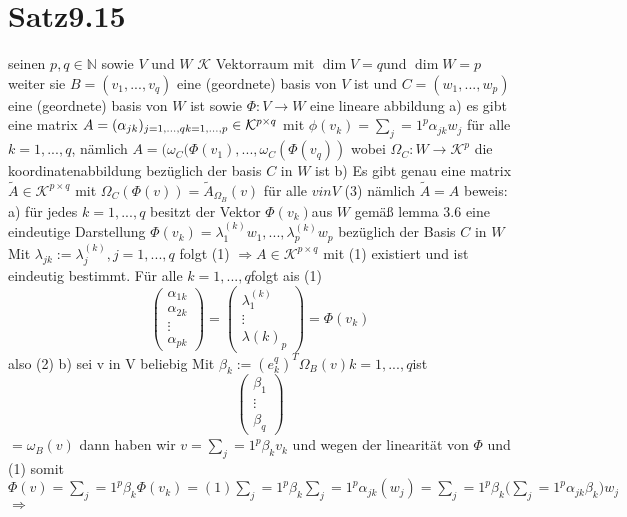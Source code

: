 \documentclass[11pt]{article}
\begin{document}
\section{Satz9.15}
seinen $  p,q \in \mathbb{N}$ sowie $V$ und $W$ $\mathcal{K}$ Vektorraum mit $\dim V =q $und $\dim W =p $ weiter sie $B= (v_1,...,v_q)$
eine  (geordnete) basis von $V$ ist und $C=(w_1,...,w_p)$ eine (geordnete) basis von $W$ ist 
sowie $\Phi: V\rightarrow W$ eine lineare abbildung
a)
es gibt eine matrix $A= (\alpha_{jk})_{j=1,...,q\\ k=1,...,p} \in \mathcal{K}^{p\times q}$ mit 
$\phi (v_k)= \sum_j=1^p{\alpha_{jk}w_j}$ für alle $k=1,...,q$, 
nämlich $A = (\omega_C(\Phi(v_1),...,\omega_C(\Phi(v_q))$ wobei  $\Omega_C : W\rightarrow \mathcal{K}^p$ die koordinatenabbildung bezüglich der basis $C$ in $W$ ist
b)
Es gibt genau eine matrix $\tilde{A} \in \mathcal{K}^{p\times q}$ mit 
$\Omega_C(\Phi(v))=\tilde{A}_{\Omega_B} (v)$ für alle $v in V$ (3)
nämlich $\tilde{ A}=A$
beweis:
a)
für jedes $k=1,...,q$ besitzt der Vektor $\Phi (v_k) $aus $W$ gemäß lemma 3.6 eine eindeutige Darstellung $\Phi (v_k)= \lambda^{(k)}_1w_1,...,\lambda^{(k)}_p w_p$
bezüglich der Basis $C$ in $W$ Mit $\lambda_{jk}:= \lambda^{(k)}_j, j=1,...,q$ folgt (1)
$\Rightarrow A \in \mathcal{K}^{p\times q}$ mit (1) existiert und ist eindeutig bestimmt.
Für alle $k=1,...,q $folgt ais (1) 
\[\begin{pmatrix}
 \alpha_{1k}\\ \alpha_{2k}\\ \vdots \\ \alpha_{pk}
\end{pmatrix}
=
\begin{pmatrix}
 \lambda^{(k)}_1\\ \vdots\\ \lambda {(k)}_p
\end{pmatrix}
=\Phi(v_k)\] also (2)
b) sei v in V beliebig Mit $\beta_k:= (e^q_k)^T \Omega_B(v) k=1,...,q $ist 
\[\begin{pmatrix}
 \beta_1\\ \vdots \\ \beta_q
\end{pmatrix}
\]
$= \omega_B(v)$ dann haben wir $v= \sum_j=1^p{\beta_{k}v_k}$ und wegen der linearität von $\Phi$ und (1) somit 
$\Phi(v)=\sum_j=1^p{\beta_{k}\Phi(v_k)}
= (1)
\sum_j=1^p{\beta_{k}\sum_j=1^p{\alpha_{jk}(w_j)}}
=
\sum_j=1^p{\beta_{k}(\sum_j=1^p{\alpha_{jk}\beta_k)w_j}}
$
$\Rightarrow $
\end{document}
